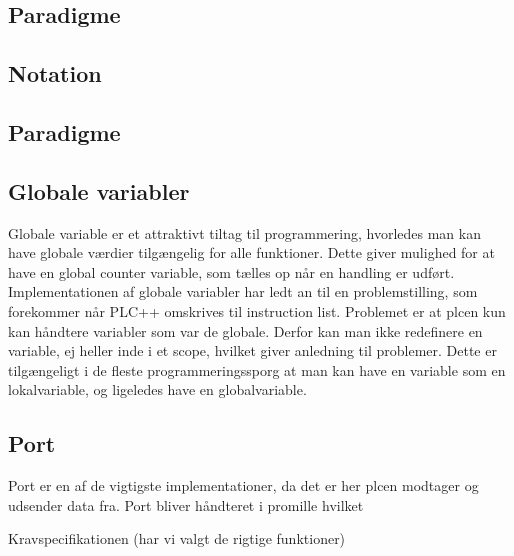 \subsection*{Paradigme}
\subsection*{Notation}

\subsection*{Paradigme}

\subsection*{Globale variabler}
Globale variable er et attraktivt tiltag til programmering, hvorledes man kan have globale værdier tilgængelig for alle funktioner.
Dette giver mulighed for at have en global counter variable, som tælles op når en handling er udført.
Implementationen af globale variabler har ledt an til en problemstilling, som forekommer når PLC++ omskrives til instruction list. Problemet er at \gls{plc}en kun kan håndtere variabler som var de globale.
Derfor kan man ikke redefinere en variable, ej heller inde i et scope, hvilket giver anledning til problemer.
Dette er tilgængeligt i de fleste programmeringssporg at man kan have en variable som en lokalvariable, og ligeledes have en globalvariable.



\subsection*{Port}
Port er en af de vigtigste implementationer, da det er her \gls{plc}en modtager og udsender data fra.
Port bliver håndteret i promille hvilket




Kravspecifikationen (har vi valgt de rigtige funktioner)


